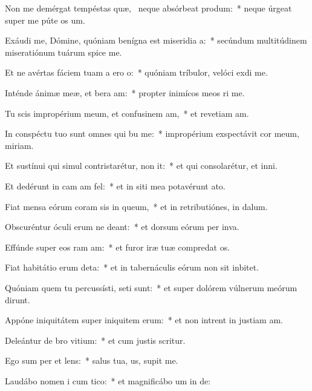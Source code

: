 \item Non me demérgat tempéstas quæ,~\pscross{} neque absórbeat  produm:~* neque úrgeat super me púte os um.
\item Exáudi me, Dómine, quóniam benígna est miseridia a:~* secúndum multitúdinem miseratiónum tuárum spice  me.
\item Et ne avértas fáciem tuam a ero o:~* quóniam tríbulor, velóci exdi me.
\item Inténde ánimæ meæ, et bera am:~* propter inimícos meos ri me.
\item Tu scis impropérium meum, et confusinem am,~* et revetiam am.
\item In conspéctu tuo sunt omnes qui bu me:~* impropérium exspectávit cor meum,  miriam.
\item Et sustínui qui simul contristarétur,  non it:~* et qui consolarétur, et  inni.
\item Et dedérunt in cam am fel:~* et in siti mea potavérunt  ato.
\item Fiat mensa eórum coram sis in queum,~* et in retributiónes,  in dalum.
\item Obscuréntur óculi erum ne deant:~* et dorsum eórum per inva.
\item Effúnde super eos ram am:~* et furor iræ tuæ compredat os.
\item Fiat habitátio erum deta:~* et in tabernáculis eórum non sit  inbitet.
\item Quóniam quem tu percussísti, seti sunt:~* et super dolórem vúlnerum meórum dirunt.
\item Appóne iniquitátem super iniquitem erum:~* et non intrent in justiam am.
\item Deleántur de bro vitium:~* et cum justis  scritur.
\item Ego sum per et lens:~* salus tua, us, supit me.
\item Laudábo nomen i cum tico:~* et magnificábo um in de:
